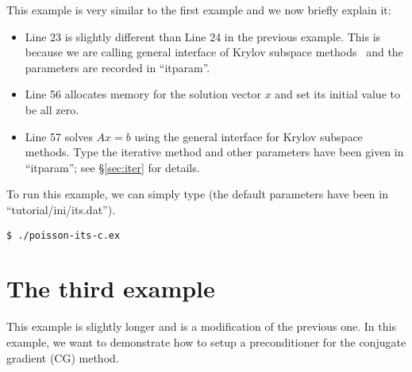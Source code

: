 \documentclass[11pt]{memoir}
\begin{document}
%
This example is very similar to the first example and we now briefly explain it:
\begin{itemize}
%
\item Line 23 is slightly different than Line 24 in the previous example. This is because we are calling general interface of Krylov subspace methods~\cite{Saad.Saad.2003fv} and the parameters are recorded in ``itparam''. 
%
\item Line 56 allocates memory for the solution vector $x$ and set its initial value to be all zero. 
%
\item Line 57 solves $Ax=b$ using the general interface for Krylov subspace methods. Type the iterative method and other parameters have been given in ``itparam''; see \S\ref{sec:iter} for details. 
%
\end{itemize}
%
To run this example, we can simply type (the default parameters have been in ``tutorial/ini/its.dat'').
%
\begin{lstlisting}[numbers=none]
$ ./poisson-its-c.ex
\end{lstlisting}

\section{The third example}\label{sec:ex3}

This example is slightly longer and is a modification of the previous one. In this example,  we want to demonstrate how to setup a preconditioner for the conjugate gradient (CG) method. 
\end{document}
